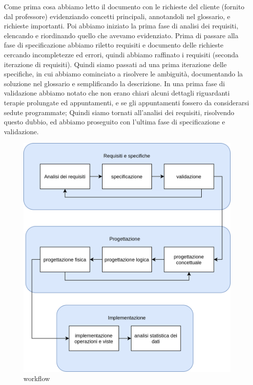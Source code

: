 \documentclass[11pt,a4paper]{article}
\begin{document}
Come prima cosa abbiamo letto il documento con le richieste del cliente (fornito dal professore)
evidenziando concetti principali, annotandoli nel glossario, e richieste importanti. Poi abbiamo iniziato la prima fase di 
analisi dei requisiti, elencando e riordinando quello che avevamo evidenziato.
Prima di passare alla fase di specificazione abbiamo riletto requisiti e documento delle richieste cercando
incompletezze ed errori, quindi abbiamo raffinato i requisiti (seconda iterazione di requisiti).
Quindi siamo passati ad una prima iterazione delle specifiche, in cui abbiamo cominciato a
risolvere le ambiguità, documentando la soluzione nel glossario e semplificando la descrizione.
In una prima fase di validazione abbiamo notato che non erano chiari alcuni dettagli riguardanti
terapie prolungate ed appuntamenti, e se gli appuntamenti fossero da considerarsi sedute programmate;
Quindi siamo tornati all'analisi dei requisiti, risolvendo questo dubbio, ed abbiamo proseguito
con l'ultima fase di specificazione e validazione.

\begin{figure}[H]
    \includegraphics[width=\linewidth]{images/workflow.png}
    \caption{workflow}
    \label{fig:workflow}
\end{figure}
\end{document}
